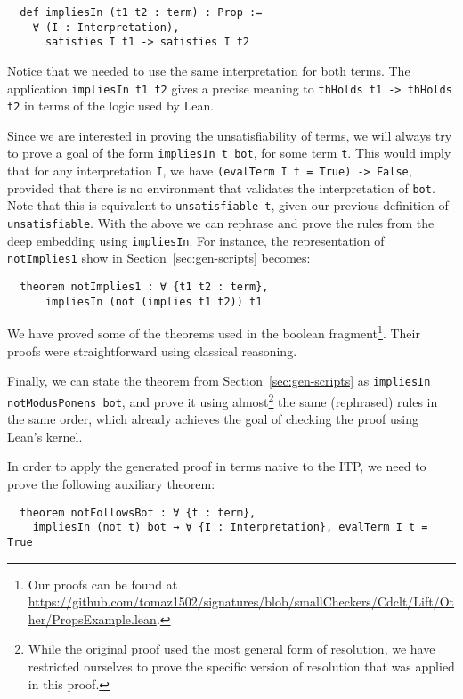 \begin{verbatim}
  def impliesIn (t1 t2 : term) : Prop :=
    ∀ (I : Interpretation),
      satisfies I t1 -> satisfies I t2
\end{verbatim}

Notice that we needed to use the same interpretation for both terms.
%
The application \texttt{impliesIn t1 t2} gives a precise meaning to \texttt{thHolds t1 -> thHolds t2} in terms of the logic used by Lean.

Since we are interested in proving the unsatisfiability of terms, we will always try to prove a goal of the form \texttt{impliesIn t bot}, for some term \texttt{t}. This would imply that for any interpretation \texttt{I}, we have \texttt{(evalTerm I t = True) -> False}, provided that there is no environment that validates the interpretation of \texttt{bot}. Note that this is equivalent to \texttt{unsatisfiable t}, given our previous definition of \texttt{unsatisfiable}.
With the above we can rephrase and prove the rules from the deep embedding using
\texttt{impliesIn}.
%
For instance, the representation of \texttt{notImplies1} show in Section~\ref{sec:gen-scripts} becomes:

\begin{verbatim}
  theorem notImplies1 : ∀ {t1 t2 : term},
      impliesIn (not (implies t1 t2)) t1
\end{verbatim}

We have proved some of the theorems used in the boolean fragment\footnote{Our proofs can be found at \url{https://github.com/tomaz1502/signatures/blob/smallCheckers/Cdclt/Lift/Other/PropsExample.lean}.}. Their proofs
were straightforward using classical reasoning.

Finally, we can state the theorem from Section~\ref{sec:gen-scripts} as
\texttt{impliesIn notModusPonens bot}, and prove it using almost\footnote{While the original proof used the most general form of resolution, we have restricted ourselves to prove the specific version of resolution that was applied in this proof.} the same
(rephrased) rules in the same order, which already achieves the goal
of checking the proof using Lean's kernel.

In order to apply the generated proof in terms native to the ITP, we need
to prove the following auxiliary theorem:

\begin{verbatim}
  theorem notFollowsBot : ∀ {t : term},
    impliesIn (not t) bot → ∀ {I : Interpretation}, evalTerm I t = True
\end{verbatim}


